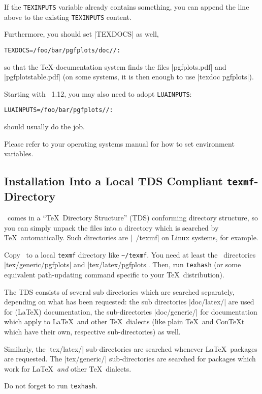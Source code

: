 If the \texttt{TEXINPUTS} variable already contains something, you can append the line above to the existing \texttt{TEXINPUTS} content.

Furthermore, you should set |TEXDOCS| as well,
\begin{verbatim}
TEXDOCS=/foo/bar/pgfplots/doc//:
\end{verbatim}
so that the \TeX-documentation system finds the files |pgfplots.pdf| and |pgfplotstable.pdf| (on some systems, it is then enough to use |texdoc pgfplots|).

Starting with \PGFPlots\ 1.12, you may also need to adopt \texttt{LUAINPUTS}:
\begin{verbatim}
LUAINPUTS=/foo/bar/pgfplots//:
\end{verbatim}
should usually do the job. 

Please refer to your operating systems manual for how to set environment variables.

\subsection{Installation Into a Local TDS Compliant \texttt{texmf}-Directory}
\label{pgfplots:tds}
\PGFPlots\ comes in a ``\TeX\ Directory Structure'' (TDS) conforming directory structure, so you can simply unpack the files into a directory which is searched by \TeX\ automatically. Such directories are |~/texmf| on Linux systems, for example.

Copy \PGFPlots\ to a local \texttt{texmf} directory like \lstinline!~/texmf!. You need at least the \PGFPlots\ directories |tex/generic/pgfplots| and |tex/latex/pgfplots|. Then, run \lstinline!texhash! (or some equivalent path-updating command specific to your \TeX\ distribution). 

The TDS consists of several sub directories which are searched separately, depending on what has been requested: the sub directories |doc/latex/| are used for (\LaTeX) documentation, the sub-directories |doc/generic/| for documentation which apply to \LaTeX\ and other \TeX\ dialects (like plain \TeX\ and Con\TeX t which have their own, respective sub-directories) as well.

Similarly, the |tex/latex/| sub-directories are searched whenever \LaTeX\ packages are requested. The |tex/generic/| sub-directories are searched for packages which work for \LaTeX\ \emph{and} other \TeX\ dialects.

Do not forget to run \lstinline!texhash!.

